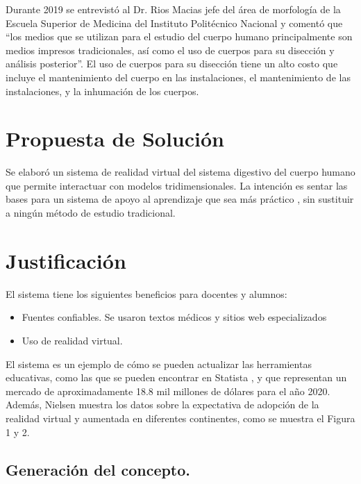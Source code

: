 Durante 2019 se entrevistó al Dr. Rios Macias jefe del área de morfología de la Escuela Superior de Medicina del Instituto Politécnico Nacional y comentó que “los medios que se utilizan para el estudio del cuerpo humano principalmente son medios impresos tradicionales, así como el uso de cuerpos para su disección y análisis posterior”. El uso de cuerpos para su disección tiene un alto costo que incluye el mantenimiento del cuerpo en las instalaciones, el mantenimiento de las instalaciones, y la inhumación de los cuerpos.
\\
\newline
\section{Propuesta de Solución}

Se elaboró un sistema de realidad virtual del sistema digestivo del cuerpo humano que permite interactuar con modelos tridimensionales. La intención es sentar las bases para un sistema de apoyo al aprendizaje que sea más práctico \cite{moore1995learning}, sin sustituir a ningún método de estudio tradicional.
\\
\newline
\section{Justificación}

El sistema tiene los siguientes beneficios para docentes y alumnos: 
\begin{itemize}
\item Fuentes confiables. Se usaron textos médicos y sitios web especializados
\item Uso de realidad virtual\cite{norton1994integrating}.
\end{itemize}

El sistema es un ejemplo de cómo se pueden actualizar las herramientas educativas, como las que se pueden encontrar en Statista \cite{web1}, y que representan un mercado de aproximadamente 18.8 mil millones de dólares para el año 2020. Además, Nielsen\cite{} muestra los datos sobre la expectativa de adopción de la realidad virtual y aumentada en diferentes continentes, como se muestra el Figura 1 y 2.

\begin{figure}[H]
	\begin{center}
	\end{center} 
\end{figure}

\begin{figure}[H]
	\begin{center}
	\end{center} 
\end{figure}

\subsection{Generación del concepto.}
